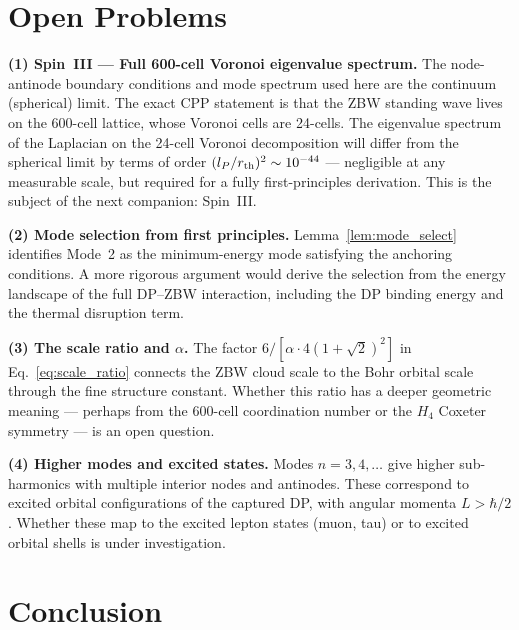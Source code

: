\documentclass[12pt]{article}
\newcommand{\rth}{r_{\rm th}}
\begin{document}
\section{Open Problems}
\label{sec:open}

\textbf{(1) Spin~III --- Full 600-cell Voronoi eigenvalue spectrum.}
The node-antinode boundary conditions and mode spectrum used here are
the continuum (spherical) limit.  The exact CPP statement is that the
ZBW standing wave lives on the 600-cell lattice, whose Voronoi cells
are 24-cells.  The eigenvalue spectrum of the Laplacian on the 24-cell
Voronoi decomposition will differ from the spherical limit by terms of
order $(l_P/\rth)^2 \sim 10^{-44}$ --- negligible at any measurable
scale, but required for a fully first-principles derivation.  This
is the subject of the next companion: Spin~III.

\textbf{(2) Mode selection from first principles.}
Lemma~\ref{lem:mode_select} identifies Mode~2 as the
minimum-energy mode satisfying the anchoring conditions.  A more
rigorous argument would derive the selection from the energy landscape
of the full DP--ZBW interaction, including the DP binding energy and
the thermal disruption term.

\textbf{(3) The scale ratio and $\alpha$.}
The factor $6/[\alpha\cdot 4(1+\sqrt{2})^2]$ in
Eq.~\eqref{eq:scale_ratio} connects the ZBW cloud scale to the Bohr
orbital scale through the fine structure constant.  Whether this
ratio has a deeper geometric meaning --- perhaps from the 600-cell
coordination number or the $H_4$ Coxeter symmetry --- is an open
question.

\textbf{(4) Higher modes and excited states.}
Modes $n = 3, 4, \ldots$ give higher sub-harmonics with multiple
interior nodes and antinodes.  These correspond to excited orbital
configurations of the captured DP, with angular momenta $L > \hbar/2$.
Whether these map to the excited lepton states (muon, tau) or to
excited orbital shells is under investigation.

\section{Conclusion}
\label{sec:conclusion}
\end{document}
